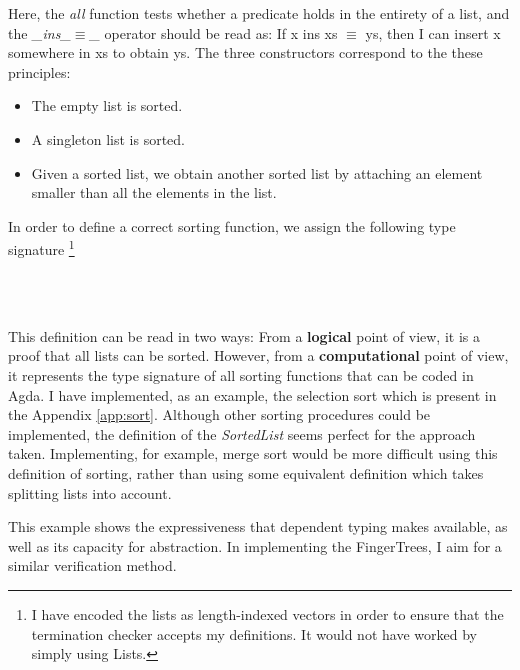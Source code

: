 \documentclass[12pt,twoside,notitlepage]{report}
\begin{document}
Here, the \textit{all} function tests whether a predicate holds in the entirety of a list, and the \textit{\_ins\_$\equiv$\_} operator should be read as: If x ins xs $\equiv$ ys, then I can insert x somewhere in xs to obtain ys. The three constructors correspond to the these principles: 
\begin{itemize}
\item The empty list is sorted.
\item A singleton list is sorted.
\item Given a sorted list, we obtain another sorted list by attaching an element smaller than all the elements in the list.
\end{itemize}

In order to define a correct sorting function, we assign the following type signature \footnote{I have encoded the lists as length-indexed vectors in order to ensure that the termination checker accepts my definitions. It would not have worked by simply using Lists.}

\begin{code}
\\
\>[0]\<[2]%
\>[2] \AgdaSymbol{:}  \AgdaSymbol{\{} \AgdaSymbol{:} \AgdaSymbol{\}}  \AgdaSymbol{(} \AgdaSymbol{:}   \AgdaSymbol{)}  \AgdaSymbol{(} \AgdaSymbol{)}\<%
\\
\end{code}

This definition can be read in two ways: From a \textbf{logical} point of view, it is a proof that all lists can be sorted. However, from a \textbf{computational} point of view, it represents the type signature of all sorting functions that can be coded in Agda. I have implemented, as an example, the selection sort which is present in the Appendix \ref{app:sort}. Although other sorting procedures could be implemented, the definition of the \textit{SortedList} seems perfect for the approach taken. Implementing, for example, merge sort would be more difficult using this definition of sorting, rather than using some equivalent definition which takes splitting lists into account.

This example shows the expressiveness that dependent typing makes available, as well as its capacity for abstraction. In implementing the FingerTrees, I aim for a similar verification method.
\end{document}
